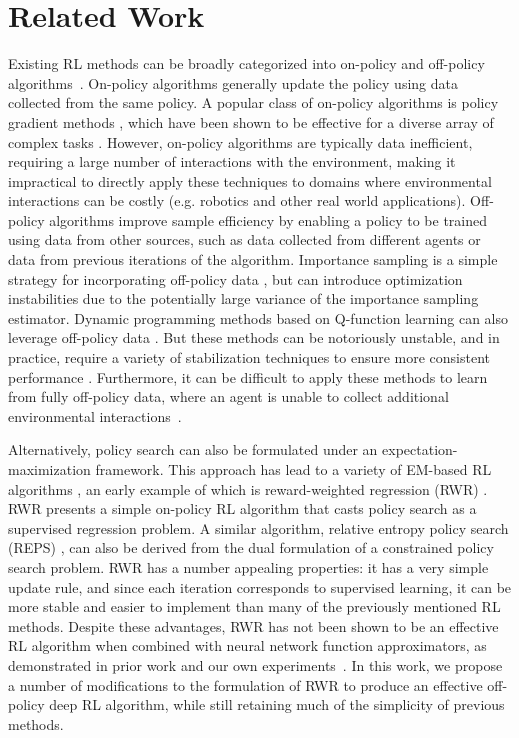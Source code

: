 \documentclass{article} \usepackage{iclr2020_conference,times}
\begin{document}
\section{Related Work}

Existing RL methods can be broadly categorized into on-policy and off-policy algorithms~\citep{Sutton1998}. On-policy algorithms generally update the policy using data collected from the same policy. A popular class of on-policy algorithms is policy gradient methods \citep{Williams1992,PoliGrad1999}, which have been shown to be effective for a diverse array of complex tasks \citep{HeessTSLMWTEWER17,Pathak2017,2018-TOG-deepMimic,Rajeswaran-RSS-18}.
However, on-policy algorithms are typically data inefficient, requiring a large number of interactions with the environment, making it impractical to directly apply these techniques to domains where environmental interactions can be costly (e.g. robotics and other real world applications).
Off-policy algorithms improve sample efficiency by enabling a policy to be trained using data from other sources, such as data collected from different agents or data from previous iterations of the algorithm. Importance sampling is a simple strategy for incorporating off-policy data \citep{Sutton1998,Meuleau00off,Hachiya2009}, but can introduce optimization instabilities due to the potentially large variance of the importance sampling estimator. Dynamic programming methods based on Q-function learning can also leverage off-policy data \citep{Precup2001,mnih2015humanlevel,DDPG2016,NAF16,haarnoja18b}. But these methods can be notoriously unstable, and in practice, require a variety of stabilization techniques to ensure more consistent performance \citep{Hasselt2016,WangBHMMKF16,Munos2016,RainbowDQN2017,fujimoto18a,nachum2018learning,fu19diagnosing}. Furthermore, it can be difficult to apply these methods to learn from fully off-policy data, where an agent is unable to collect additional environmental interactions~\citep{fujimoto19offpolicy, BEAR2019}.

Alternatively, policy search can also be formulated under an expectation-maximization framework. This approach has lead to a variety of EM-based RL algorithms \citep{Peters2010REP,Neumann2011,abdolmaleki2018maximum}, an early example of which is reward-weighted regression (RWR) \citep{Peters2007RWR}. RWR presents a simple on-policy RL algorithm that casts policy search as a supervised regression problem.
A similar algorithm, relative entropy policy search (REPS) \citep{Peters2010REP}, can also be derived from the dual formulation of a constrained policy search problem. RWR has a number appealing properties: it has a very simple update rule, and  since each iteration corresponds to supervised learning, it can be more stable and easier to implement than many of the previously mentioned RL methods. 
Despite these advantages, RWR has not been shown to be an effective RL algorithm when combined with neural network function approximators, as demonstrated in prior work and our own experiments~\citep{TRPOschulman15,DuanCHSA16}. In this work, we propose a number of modifications to the formulation of RWR to produce an effective off-policy deep RL algorithm, while still retaining much of the simplicity of previous methods.
\end{document}
